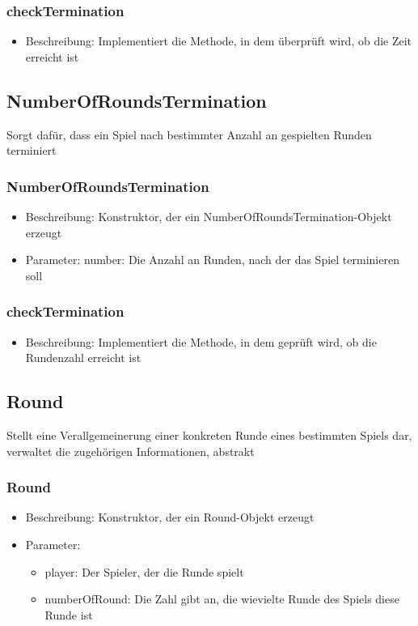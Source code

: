 \documentclass[a4paper]{scrreprt}
\begin{document}
    \subsubsection{checkTermination}
    \begin{itemize}
        \item Beschreibung: Implementiert die Methode, in dem überprüft wird, ob die Zeit erreicht ist
    \end{itemize}

    \subsection{NumberOfRoundsTermination}
    Sorgt dafür, dass ein Spiel nach bestimmter Anzahl an gespielten Runden terminiert
    \subsubsection{NumberOfRoundsTermination}
    \begin{itemize}
        \item Beschreibung: Konstruktor, der ein NumberOfRoundsTermination-Objekt erzeugt
        \item Parameter: number: Die Anzahl an Runden, nach der das Spiel terminieren soll
    \end{itemize}
    \subsubsection{checkTermination}
    \begin{itemize}
        \item Beschreibung: Implementiert die Methode, in dem geprüft wird, ob die Rundenzahl erreicht ist
    \end{itemize}

    \subsection{Round}
    Stellt eine Verallgemeinerung einer konkreten Runde eines bestimmten Spiels dar, verwaltet die zugehörigen Informationen, abstrakt
    \subsubsection{Round}
    \begin{itemize}
        \item Beschreibung: Konstruktor, der ein Round-Objekt erzeugt
        \item Parameter:
        \begin{itemize}
            \item player: Der Spieler, der die Runde spielt
            \item numberOfRound: Die Zahl gibt an, die wievielte Runde des Spiels diese Runde ist
        \end{itemize}
    \end{itemize}
\end{document}
